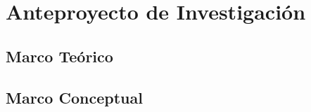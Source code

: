\chapter{Anteproyecto de Investigación}
\onehalfspacing
\setlength{\parskip}{0.5cm}
\setlength{\parindent}{1.27cm}
\section*{Marco Teórico}







\section*{Marco Conceptual}



\newpage
